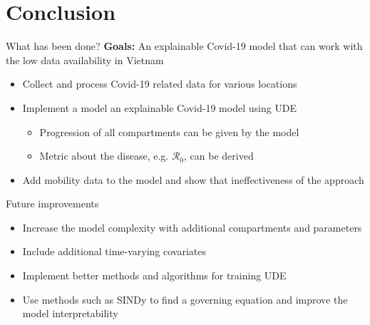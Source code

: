 \section{Conclusion}

\begin{frame}{What has been done?}
    \textbf{Goals:} An explainable Covid-19 model that can work with the low data availability in Vietnam
    \begin{itemize}
        \item<2-> Collect and process Covid-19 related data for various locations
        \item<3-> Implement a model an explainable Covid-19 model using \gls{UDE}
        \begin{itemize}
            \item Progression of all compartments can be given by the model
            \item Metric about the disease, e.g. $\mathcal{R}_0$, can be derived
        \end{itemize}
        \item<4-> Add mobility data to the model and show that ineffectiveness of the approach
    \end{itemize}
\end{frame}

\begin{frame}{Future improvements}
    \begin{itemize}
        \item<1-> Increase the model complexity with additional compartments and parameters
        \item<2-> Include additional time-varying covariates
        \item<3-> Implement better methods and algorithms for training \gls{UDE}
        \item<4-> Use methods such as \gls{SINDy} to find a governing equation and improve the model interpretability
    \end{itemize}
\end{frame}